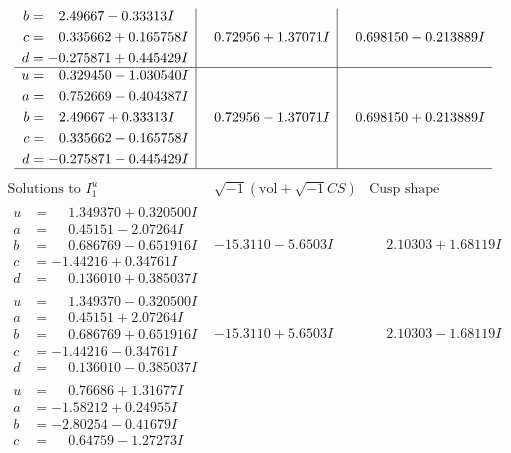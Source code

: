 \documentclass[1p]{elsarticle_modified}
\theoremstyle{definition}
\newcommand{\I}{\sqrt{-1}}
\begin{document}
$$\begin{array}{c|c|c}
\begin{aligned}
b &= \phantom{-}2.49667 - 0.33313 I \\
c &= \phantom{-}0.335662 + 0.165758 I \\
d &= -0.275871 + 0.445429 I\end{aligned}
 & \phantom{-}0.72956 + 1.37071 I & \phantom{-}0.698150 - 0.213889 I \\ \hline\begin{aligned}
u &= \phantom{-}0.329450 - 1.030540 I \\
a &= \phantom{-}0.752669 - 0.404387 I \\
b &= \phantom{-}2.49667 + 0.33313 I \\
c &= \phantom{-}0.335662 - 0.165758 I \\
d &= -0.275871 - 0.445429 I\end{aligned}
 & \phantom{-}0.72956 - 1.37071 I & \phantom{-}0.698150 + 0.213889 I\\
 \hline 
 \end{array}$$\newpage$$\begin{array}{c|c|c}  
\text{Solutions to }I^u_{1}& \I (\text{vol} + \sqrt{-1}CS) & \text{Cusp shape}\\
 \hline 
\begin{aligned}
u &= \phantom{-}1.349370 + 0.320500 I \\
a &= \phantom{-}0.45151 - 2.07264 I \\
b &= \phantom{-}0.686769 - 0.651916 I \\
c &= -1.44216 + 0.34761 I \\
d &= \phantom{-}0.136010 + 0.385037 I\end{aligned}
 & -15.3110 - 5.6503 I & \phantom{-}2.10303 + 1.68119 I \\ \hline\begin{aligned}
u &= \phantom{-}1.349370 - 0.320500 I \\
a &= \phantom{-}0.45151 + 2.07264 I \\
b &= \phantom{-}0.686769 + 0.651916 I \\
c &= -1.44216 - 0.34761 I \\
d &= \phantom{-}0.136010 - 0.385037 I\end{aligned}
 & -15.3110 + 5.6503 I & \phantom{-}2.10303 - 1.68119 I \\ \hline\begin{aligned}
u &= \phantom{-}0.76686 + 1.31677 I \\
a &= -1.58212 + 0.24955 I \\
b &= -2.80254 - 0.41679 I \\
c &= \phantom{-}0.64759 - 1.27273 I \\

\end{aligned}
\end{array}$$
\end{document}
